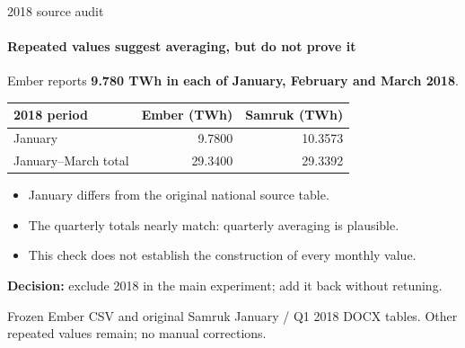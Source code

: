 \documentclass[aspectratio=169,10pt]{beamer}
\newcommand{\Source}[1]{\par\vfill{\fontsize{6.5}{7.5}\selectfont\color{black!65}#1\par}}
\begin{document}
\begin{frame}[t]{2018 source audit}
\framesubtitle{Repeated values suggest averaging, but do not prove it}
Ember reports \textbf{9.780 TWh in each of January, February and March 2018}.
\begin{center}
\begin{tabular}{lrr}\toprule
2018 period & Ember (TWh) & Samruk (TWh)\\\midrule
January & 9.7800 & 10.3573\\
January--March total & 29.3400 & 29.3392\\\bottomrule
\end{tabular}
\end{center}
\begin{itemize}
\item January differs from the original national source table.
\item The quarterly totals nearly match: quarterly averaging is plausible.
\item This check does not establish the construction of every monthly value.
\end{itemize}
\textbf{Decision:} exclude 2018 in the main experiment; add it back without retuning.
\Source{Frozen Ember CSV and original Samruk January / Q1 2018 DOCX tables. Other repeated values remain; no manual corrections.}
\end{frame}
\end{document}

